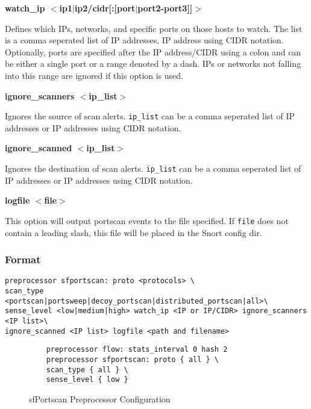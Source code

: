 \documentclass[english]{report}
\newcounter{slistnum}
\newenvironment{slist}
{ \begin{list}{ {\bf \arabic{slistnum}.} }{\usecounter{slistnum} } }
{ \end{list} }
\begin{document}
\begin{slist}
\item \textbf{watch\_ip $<$ip1$|$ip2/cidr[:[port$|$port2-port3]]$>$ }

  Defines which IPs, networks, and specific ports on those hosts to watch.
  The list is a comma seperated list of IP addresses, IP address using CIDR
  notation.  Optionally, ports are specified after the IP address/CIDR using
  a colon and can be either a single port or a range denoted by a dash.
  IPs or networks not falling into this range are ignored if this option
  is used.

\item \textbf{ignore\_scanners $<$ip\_list$>$ }

  Ignores the source of scan alerts.  \texttt{ip\_list} can be a comma
  seperated list of IP addresses or IP addresses using CIDR notation.

\item \textbf{ignore\_scanned $<$ip\_list$>$ }

  Ignores the destination of scan alerts. \texttt{ip\_list} can be a comma
  seperated list of IP addresses or IP addresses using CIDR notation.

\item \textbf{logfile $<$file$>$ } 

  This option will output portscan events to the file specified. If
  \texttt{file} does not contain a leading slash, this file will be placed in
  the Snort config dir.
\end{slist}

\subsubsection{Format}

\begin{verbatim}
preprocessor sfportscan: proto <protocols> \
scan_type <portscan|portsweep|decoy_portscan|distributed_portscan|all>\
sense_level <low|medium|high> watch_ip <IP or IP/CIDR> ignore_scanners <IP list>\
ignore_scanned <IP list> logfile <path and filename>
\end{verbatim}

\begin{figure}[!hbpt]
\begin{verbatim}
	preprocessor flow: stats_interval 0 hash 2
	preprocessor sfportscan: proto { all } \
    scan_type { all } \
    sense_level { low }
\end{verbatim}
\caption{sfPortscan Preprocessor Configuration \label{sfPortscan Example}}
\end{figure}
\end{document}
